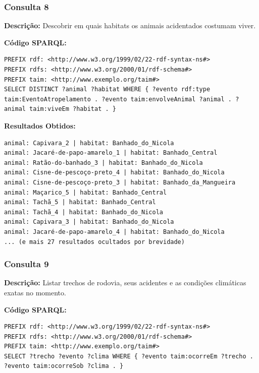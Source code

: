 \documentclass[12pt,a4paper]{article}
\begin{document}
\vspace{1cm}
\subsubsection*{Consulta 8}

\textbf{Descrição:} Descobrir em quais habitats os animais acidentados costumam viver.

\textbf{Código SPARQL:}
\begin{lstlisting}
PREFIX rdf: <http://www.w3.org/1999/02/22-rdf-syntax-ns#>
PREFIX rdfs: <http://www.w3.org/2000/01/rdf-schema#>
PREFIX taim: <http://www.exemplo.org/taim#>
SELECT DISTINCT ?animal ?habitat WHERE { ?evento rdf:type taim:EventoAtropelamento . ?evento taim:envolveAnimal ?animal . ?animal taim:viveEm ?habitat . }
\end{lstlisting}

\textbf{Resultados Obtidos:}
\begin{lstlisting}
animal: Capivara_2 | habitat: Banhado_do_Nicola
animal: Jacaré-de-papo-amarelo_1 | habitat: Banhado_Central
animal: Ratão-do-banhado_3 | habitat: Banhado_do_Nicola
animal: Cisne-de-pescoço-preto_4 | habitat: Banhado_do_Nicola
animal: Cisne-de-pescoço-preto_3 | habitat: Banhado_da_Mangueira
animal: Maçarico_5 | habitat: Banhado_Central
animal: Tachã_5 | habitat: Banhado_Central
animal: Tachã_4 | habitat: Banhado_do_Nicola
animal: Capivara_3 | habitat: Banhado_do_Nicola
animal: Jacaré-de-papo-amarelo_4 | habitat: Banhado_do_Nicola
... (e mais 27 resultados ocultados por brevidade)
\end{lstlisting}

\vspace{1cm}
\subsubsection*{Consulta 9}

\textbf{Descrição:} Listar trechos de rodovia, seus acidentes e as condições climáticas exatas no momento.

\textbf{Código SPARQL:}
\begin{lstlisting}
PREFIX rdf: <http://www.w3.org/1999/02/22-rdf-syntax-ns#>
PREFIX rdfs: <http://www.w3.org/2000/01/rdf-schema#>
PREFIX taim: <http://www.exemplo.org/taim#>
SELECT ?trecho ?evento ?clima WHERE { ?evento taim:ocorreEm ?trecho . ?evento taim:ocorreSob ?clima . }
\end{lstlisting}
\end{document}
